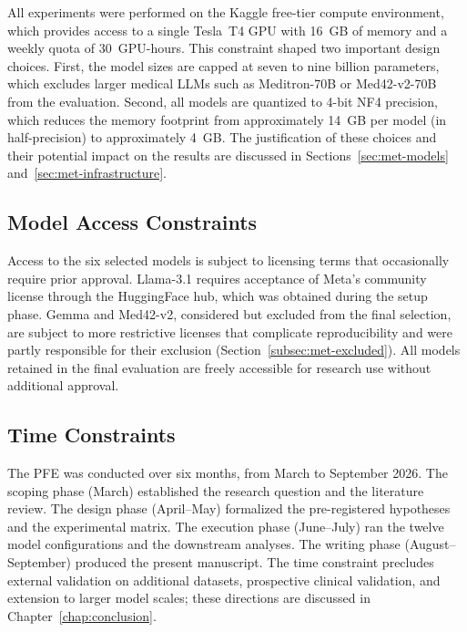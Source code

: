 All experiments were performed on the Kaggle free-tier compute 
environment, which provides access to a single Tesla~T4 GPU with 
16~GB of memory and a weekly quota of 30~GPU-hours. This constraint 
shaped two important design choices. First, the model sizes are 
capped at seven to nine billion parameters, which excludes larger 
medical LLMs such as Meditron-70B or Med42-v2-70B from the 
evaluation. Second, all models are quantized to 4-bit NF4 precision, 
which reduces the memory footprint from approximately 14~GB per 
model (in half-precision) to approximately 4~GB. The justification 
of these choices and their potential impact on the results are 
discussed in Sections~\ref{sec:met-models} and~\ref{sec:met-infrastructure}.

\subsection{Model Access Constraints}
\label{subsec:ctx-access}

Access to the six selected models is subject to licensing terms that 
occasionally require prior approval. Llama-3.1 requires acceptance of 
Meta's community license through the HuggingFace hub, which was 
obtained during the setup phase. Gemma and Med42-v2, considered but 
excluded from the final selection, are subject to more restrictive 
licenses that complicate reproducibility and were partly responsible 
for their exclusion (Section~\ref{subsec:met-excluded}). All models 
retained in the final evaluation are freely accessible for research 
use without additional approval.

\subsection{Time Constraints}
\label{subsec:ctx-time}

The PFE was conducted over six months, from March to September 2026. 
The scoping phase (March) established the research question and the 
literature review. The design phase (April--May) formalized the 
pre-registered hypotheses and the experimental matrix. The execution 
phase (June--July) ran the twelve model configurations and the 
downstream analyses. The writing phase (August--September) produced 
the present manuscript. The time constraint precludes external 
validation on additional datasets, prospective clinical validation, 
and extension to larger model scales; these directions are discussed 
in Chapter~\ref{chap:conclusion}.

